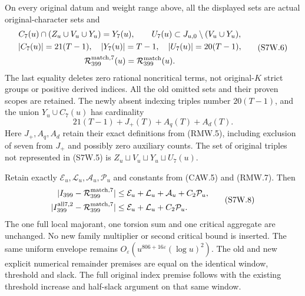 \begin{theorem}
\label{AC-G198-window}
On every original datum and weight range above, all the displayed
sets are actual original-character sets and
\[
 \begin{gathered}
 C_7(u)\cap(Z_u\cup V_u\cup Y_u)=Y_7(u),\qquad
 U_7(u)\subset J_{u,0}\setminus(V_u\cup Y_u),\\
 |C_7(u)|=21(T-1),\quad |Y_7(u)|=T-1,\quad |U_7(u)|=20(T-1),\\
 \mathcal R_{399}^{\rm match,7}(u)=\mathcal R_{399}^{\rm match}(u).
 \end{gathered}\tag{S7W.6}
\]
The last equality deletes zero rational noncritical terms, not
original-$K$ strict groups or positive derived indices.
All the old omitted sets and their proven scopes are retained.
The newly absent indexing triples number $20(T-1)$, and the
union $Y_u\cup C_7(u)$ has cardinality
\[
              21(T-1)+J_+(T)+A_q(T)+A_d(T).
 \tag{S7W.7}
\]
Here $J_+,A_q,A_d$ retain their exact definitions from (RMW.5),
including exclusion of seven from $J_+$ and possibly zero auxiliary
counts. The set of original triples not represented in (S7W.5)
is $Z_u\sqcup V_u\sqcup Y_u\sqcup U_7(u)$.

Retain exactly $\mathcal E_u,\mathcal L_u,\mathcal A_u,\mathcal P_u$
and constants from (CAW.5) and (RMW.7). Then
\[
 \begin{aligned}
 |I_{399}-\mathcal R_{399}^{\rm match,7}|&\leq
          \mathcal E_u+\mathcal L_u+\mathcal A_u+C_2\mathcal P_u,\\
 |I_{399}^{\rm all7,2}-\mathcal R_{399}^{\rm match,7}|&\leq
          \mathcal E_u+\mathcal L_u+C_2\mathcal P_u.
 \end{aligned}\tag{S7W.8}
\]
The one full local majorant, one torsion sum and one critical
aggregate are unchanged. No new family multiplier or second
critical bound is inserted. The same uniform envelope remains
$O_\varepsilon(u^{806+16\varepsilon}(\log u)^2)$.
The old and new explicit numerical remainder premises are equal
on the identical window, threshold and slack. The full original
index premise follows with the existing threshold increase and
half-slack argument on that same window.
\end{theorem}

